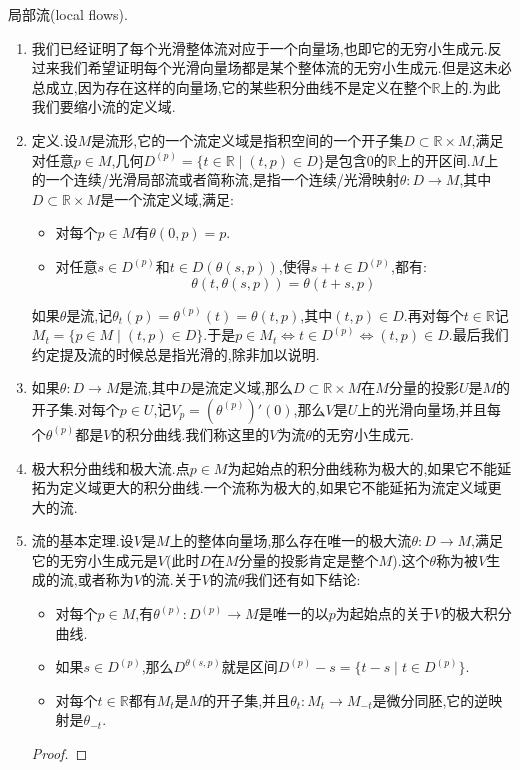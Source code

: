 局部流(local flows).
\begin{enumerate}
	\item 我们已经证明了每个光滑整体流对应于一个向量场,也即它的无穷小生成元.反过来我们希望证明每个光滑向量场都是某个整体流的无穷小生成元.但是这未必总成立,因为存在这样的向量场,它的某些积分曲线不是定义在整个$\mathbb{R}$上的.为此我们要缩小流的定义域.
	\item 定义.设$M$是流形,它的一个流定义域是指积空间的一个开子集$D\subset\mathbb{R}\times M$,满足对任意$p\in M$,几何$D^{(p)}=\{t\in\mathbb{R}\mid(t,p)\in D\}$是包含0的$\mathbb{R}$上的开区间.$M$上的一个连续/光滑局部流或者简称流,是指一个连续/光滑映射$\theta:D\to M$,其中$D\subset\mathbb{R}\times M$是一个流定义域,满足:
	\begin{itemize}
		\item 对每个$p\in M$有$\theta(0,p)=p$.
		\item 对任意$s\in D^{(p)}$和$t\in D(\theta(s,p))$,使得$s+t\in D^{(p)}$,都有:
		$$\theta(t,\theta(s,p))=\theta(t+s,p)$$
	\end{itemize}
	
	如果$\theta$是流,记$\theta_t(p)=\theta^{(p)}(t)=\theta(t,p)$,其中$(t,p)\in D$.再对每个$t\in\mathbb{R}$记$M_t=\{p\in M\mid(t,p)\in D\}$.于是$p\in M_t\Leftrightarrow t\in D^{(p)}\Leftrightarrow(t,p)\in D$.最后我们约定提及流的时候总是指光滑的,除非加以说明.
	\item 如果$\theta:D\to M$是流,其中$D$是流定义域,那么$D\subset\mathbb{R}\times M$在$M$分量的投影$U$是$M$的开子集.对每个$p\in U$,记$V_p=(\theta^{(p)})'(0)$,那么$V$是$U$上的光滑向量场,并且每个$\theta^{(p)}$都是$V$的积分曲线.我们称这里的$V$为流$\theta$的无穷小生成元.
	\item 极大积分曲线和极大流.点$p\in M$为起始点的积分曲线称为极大的,如果它不能延拓为定义域更大的积分曲线.一个流称为极大的,如果它不能延拓为流定义域更大的流.
	\item 流的基本定理.设$V$是$M$上的整体向量场,那么存在唯一的极大流$\theta:D\to M$,满足它的无穷小生成元是$V$(此时$D$在$M$分量的投影肯定是整个$M$).这个$\theta$称为被$V$生成的流,或者称为$V$的流.关于$V$的流$\theta$我们还有如下结论:
	\begin{itemize}
		\item 对每个$p\in M$,有$\theta^{(p)}:D^{(p)}\to M$是唯一的以$p$为起始点的关于$V$的极大积分曲线.
		\item 如果$s\in D^{(p)}$,那么$D^{\theta(s,p)}$就是区间$D^{(p)}-s=\{t-s\mid t\in D^{(p)}\}$.
		\item 对每个$t\in\mathbb{R}$都有$M_t$是$M$的开子集,并且$\theta_t:M_t\to M_{-t}$是微分同胚,它的逆映射是$\theta_{-t}$.
	\end{itemize}
	\begin{proof}
		

\end{proof}
\end{enumerate}
